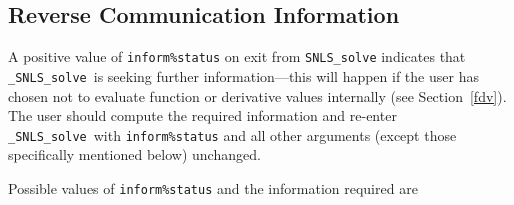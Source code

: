 \documentclass{galahad}
\newcommand{\packagename}{SNLS}
\newcommand{\fullpackagename}{\libraryname\_\packagename}
\newcommand{\solver}{{\tt \fullpackagename\_solve}}
\begin{document}

\subsection{\label{reverse}Reverse Communication Information}

A positive value of {\tt inform\%status} on exit from
{\tt \packagename\_solve}
indicates that
\solver\ is seeking further information---this will happen
if the user has chosen not to evaluate function or
derivative values internally (see Section~\ref{fdv}).
The user should compute the required information and re-enter \solver\
with {\tt inform\%status} and all other arguments (except those specifically
mentioned below) unchanged.

Possible values of {\tt inform\%status} and the information required are
\end{document}
